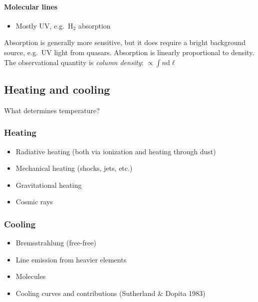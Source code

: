 \documentclass{article}
\begin{document}
\paragraph{Molecular lines}
\begin{itemize}
    \item Mostly UV, e.g.\ H$_{2}$ absorption
\end{itemize}
Absorption is generally more sensitive, but it does require a bright
background source, e.g.\ UV light from quasars. Absorption is
linearly proportional to density. The observational quantity is
\textit{column density}: $\propto\int{n\mathrm{d}\ell} $

\subsection{Heating and cooling} What determines temperature?
\subsubsection{Heating}
\begin{itemize}
    \item Radiative heating (both via ionization and heating through dust)
    \item Mechanical heating (shocks, jets, etc.)
    \item Gravitational heating
    \item Cosmic rays
\end{itemize}
\subsubsection{Cooling}
\begin{itemize}
    \item Bremsstrahlung (free-free)
    \item Line emission from heavier elements
    \item Molecules
    \item Cooling curves and contributions (Sutherland \& Dopita 1983)
\end{itemize}
\end{document}

